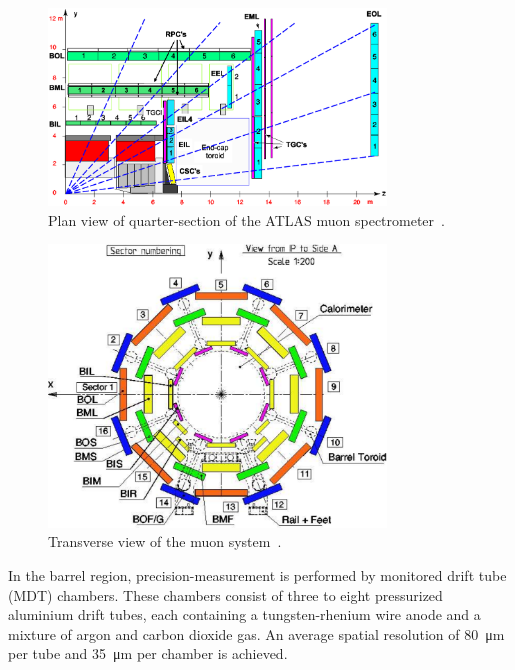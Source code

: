 \begin{figure}[tbhp]
  \centering
    \includegraphics[width=0.80\textwidth]{PartDetector/Diagrams/Muon_section.eps}
    \caption[Plan view of quarter-section of the ATLAS muon spectrometer.]{Plan view of quarter-section of the ATLAS muon spectrometer~\cite{Detector:ATLASExperimentGeneral}.}
  \label{fig:DetectorMuonOverview}
\end{figure}

\begin{figure}[htbp]
  \centering
    \includegraphics[width=0.80\textwidth]{PartDetector/Diagrams/Muon_sector_numbering.pdf}
    \caption[Transverse view of the muon system.]{Transverse view of the muon system~\cite{Detector:ATLASExperimentGeneral}.}
  \label{fig:DetectorTransverse}
\end{figure}

In the barrel region, precision-measurement is performed by monitored drift tube (MDT) chambers. These chambers consist of three to eight pressurized aluminium drift tubes, each containing a tungsten-rhenium wire anode and a mixture of argon and carbon dioxide gas. An average spatial resolution of \SI{80}{\um} per tube and \SI{35}{\um} per chamber is achieved.

